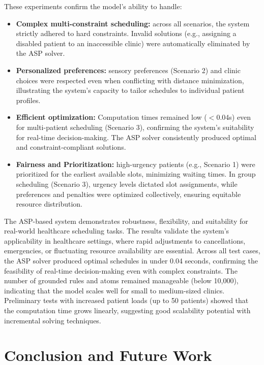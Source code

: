 \documentclass{tlp}
\begin{document}
These experiments confirm the model's ability to handle:

\begin{itemize}
    \item \textbf{Complex multi-constraint scheduling:} across all scenarios, the system strictly adhered to hard constraints. Invalid solutions (e.g., assigning a disabled patient to an inaccessible clinic) were automatically eliminated by the ASP solver.
    \item \textbf{Personalized preferences:} sensory preferences (Scenario 2) and clinic choices were respected even when conflicting with distance minimization, illustrating the system’s capacity to tailor schedules to individual patient profiles.
    \item \textbf{Efficient optimization:} Computation times remained low ($<$0.04s) even for multi-patient scheduling (Scenario 3), confirming the system’s suitability for real-time decision-making. The ASP solver consistently produced optimal and constraint-compliant solutions.
    \item \textbf{Fairness and Prioritization:} high-urgency patients (e.g., Scenario 1) were prioritized for the earliest available slots, minimizing waiting times. In group scheduling (Scenario 3), urgency levels dictated slot assignments, while preferences and penalties were optimized collectively, ensuring equitable resource distribution.
\end{itemize}

The ASP-based system demonstrates robustness, flexibility, and suitability for real-world healthcare scheduling tasks. The results validate the system’s applicability in healthcare settings, where rapid adjustments to cancellations, emergencies, or fluctuating resource availability are essential. Across all test cases, the ASP solver produced optimal schedules in under 0.04 seconds, confirming the feasibility of real-time decision-making even with complex constraints. The number of grounded rules and atoms remained manageable (below 10,000), indicating that the model scales well for small to medium-sized clinics. Preliminary tests with increased patient loads (up to 50 patients) showed that the computation time grows linearly, suggesting good scalability potential with incremental solving techniques.

\section{Conclusion and Future Work}
\label{conclusion}
\end{document}
